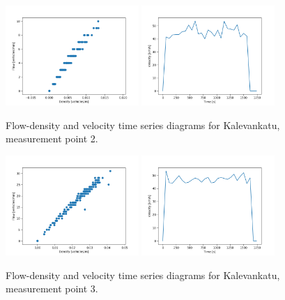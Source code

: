 \documentclass[english, 12pt, a4paper, elec, utf8, pdfa, online]{aaltothesis}
\begin{document}
\clearpage
\begin{figure}[ht!]
    \centering
    \includegraphics[width=0.45\textwidth]{graphs/Kalevankatu_2_flw_dns.png}
    \includegraphics[width=0.45\textwidth]{graphs/Kalevankatu_2_spd_time_6.png}
    \caption{Flow-density and velocity time series diagrams for Kalevankatu, measurement point 2.}
\end{figure}
\begin{figure}[ht!]
    \centering
    \includegraphics[width=0.45\textwidth]{graphs/Kalevankatu_3_flw_dns.png}
    \includegraphics[width=0.45\textwidth]{graphs/Kalevankatu_3_spd_time_6.png}
    \caption{Flow-density and velocity time series diagrams for Kalevankatu, measurement point 3.}
\end{figure}
\end{document}
